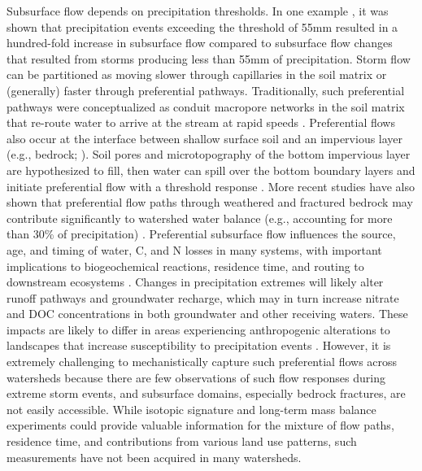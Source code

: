 \documentclass[preprint,review, 12pt]{elsarticle}
\begin{document}
Subsurface flow depends on precipitation thresholds. In one example \citep{Tromp-vanMeerveld2006}, it was shown that precipitation events exceeding the threshold of 55mm resulted in a hundred-fold increase in subsurface flow compared to subsurface flow changes that resulted from storms producing less than 55mm of precipitation. Storm flow can be partitioned as moving slower through capillaries in the soil matrix or (generally) faster through preferential pathways. Traditionally, such preferential pathways were conceptualized as conduit macropore networks in the soil matrix that re-route water to arrive at the stream at rapid speeds \citep{Beven1982}. Preferential flows also occur at the interface between shallow surface soil and an impervious layer (e.g., bedrock; \citealp{Freer2002, Graham2010, Hopp2009, Lehmann2007, McGlynn2003, Salve2012, Tani1997, Tromp-vanMeerveld2006a}). Soil pores and microtopography of the bottom impervious layer are hypothesized to fill, then water can spill over the bottom boundary layers and initiate preferential flow with a threshold response \citep{Tromp-vanMeerveld2006a}. More recent studies have also shown that preferential flow paths through weathered and fractured bedrock may contribute significantly to watershed water balance (e.g., accounting for more than 30\% of precipitation) \citep{Kosugi2006, Graham2010, Aishlin2011, Flinchum2018, Tromp-vanMeerveld2007}. Preferential subsurface flow influences the source, age, and timing of water, C, and N losses in many systems, with important implications to biogeochemical reactions, residence time, and routing to downstream ecosystems \citep{Lohse2009}. Changes in precipitation extremes will likely alter runoff pathways and groundwater recharge, which may in turn increase nitrate and DOC concentrations in both groundwater and other receiving waters. These impacts are likely to differ in areas experiencing anthropogenic alterations to landscapes that increase susceptibility to precipitation events \citep{Walsh2005, Burns2012}. However, it is extremely challenging to mechanistically  capture such preferential flows across watersheds because there are few observations of such flow responses during extreme storm events, and subsurface domains, especially bedrock fractures, are not easily accessible. While isotopic signature and long-term mass balance experiments could provide valuable information for the mixture of flow paths, residence time, and contributions from various land use patterns, such measurements have not been acquired in many watersheds.
    
\end{document}
